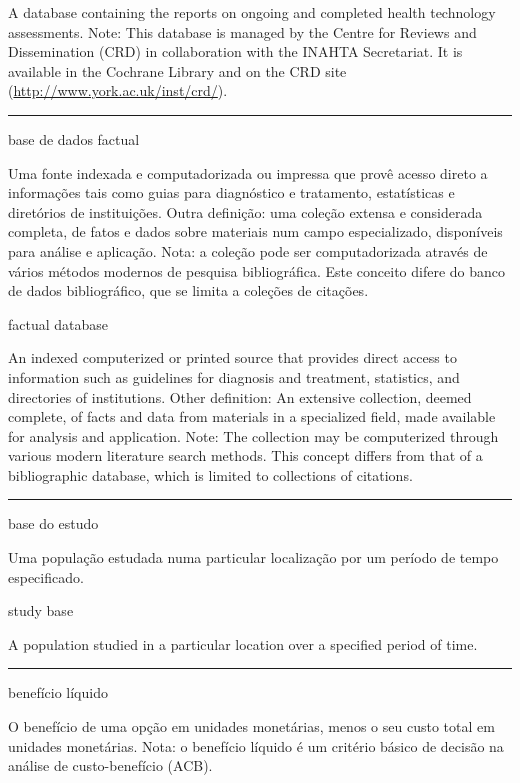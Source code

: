 \documentclass[
  openany]{book}
\begin{document}
A database containing the reports on ongoing and completed health technology assessments. Note: This database is managed by the Centre for Reviews and Dissemination (CRD) in collaboration with the INAHTA Secretariat. It is available in the Cochrane Library and on the CRD site (\url{http://www.york.ac.uk/inst/crd/}).

\begin{center}\rule{0.5\linewidth}{0.5pt}\end{center}

base de dados factual

Uma fonte indexada e computadorizada ou impressa que provê acesso direto a informações tais como guias para diagnóstico e tratamento, estatísticas e diretórios de instituições. Outra definição: uma coleção extensa e considerada completa, de fatos e dados sobre materiais num campo especializado, disponíveis para análise e aplicação. Nota: a coleção pode ser computadorizada através de vários métodos modernos de pesquisa bibliográfica. Este conceito difere do banco de dados bibliográfico, que se limita a coleções de citações.

factual database

An indexed computerized or printed source that provides direct access to information such as guidelines for diagnosis and treatment, statistics, and directories of institutions. Other definition: An extensive collection, deemed complete, of facts and data from materials in a specialized field, made available for analysis and application. Note: The collection may be computerized through various modern literature search methods. This concept differs from that of a bibliographic database, which is limited to collections of citations.

\begin{center}\rule{0.5\linewidth}{0.5pt}\end{center}

base do estudo

Uma população estudada numa particular localização por um período de tempo especificado.

study base

A population studied in a particular location over a specified period of time.

\begin{center}\rule{0.5\linewidth}{0.5pt}\end{center}

benefício líquido

O benefício de uma opção em unidades monetárias, menos o seu custo total em unidades monetárias. Nota: o benefício líquido é um critério básico de decisão na análise de custo-benefício (ACB).
\end{document}
